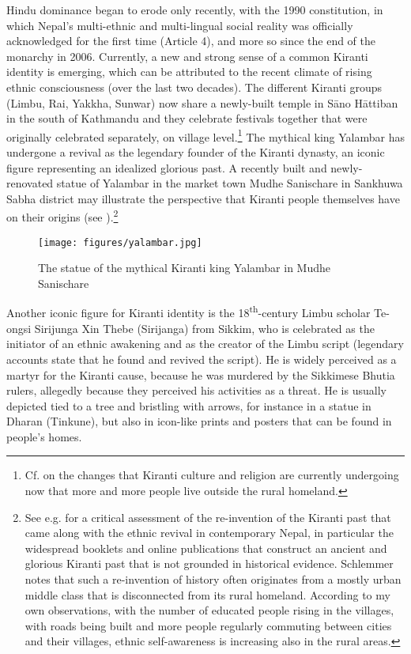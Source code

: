 Hindu dominance began to erode only recently, with the 1990 constitution, in which Nepal's multi-ethnic and multi-lingual social reality was officially acknowledged for the first time (Article 4), and more so since the end of the monarchy in 2006. Currently, a new and strong sense of a common Kiranti identity is emerging, which can be attributed to the recent climate of rising ethnic consciousness (over the last two decades). The different Kiranti groups (Limbu, Rai, Yakkha, Sunwar) now share a newly-built temple in Sāno Hāttiban in the south of Kathmandu and they celebrate festivals together that were originally celebrated separately, on
village level.\footnote{Cf. \citet{Gaenszle_Redefining} on the changes that Kiranti culture and religion are currently undergoing now that more and more people live outside the rural homeland.}  The mythical king Yalambar has undergone a revival as the legendary founder of the Kiranti dynasty, an iconic figure representing an idealized glorious past. A recently built and newly-renovated statue of Yalambar in the market town Mudhe Sanischare in Sankhuwa Sabha district may illustrate the perspective that Kiranti people themselves have on their origins (see ).\footnote{See e.g. \citet{Schlemmer2003_New} for a critical assessment of the re-invention of the Kiranti past that came along with the ethnic revival in contemporary Nepal, in particular the widespread booklets and online publications that construct an ancient and glorious Kiranti past that is not grounded in historical evidence. Schlemmer notes that such a re-invention of history often originates from a mostly urban middle class that is disconnected from its rural homeland. According to my own observations, with the number of educated people rising in the villages, with roads being built and more people regularly commuting between cities and their villages, ethnic self-awareness is increasing also in the rural areas.}

\begin{figure}
\centering
\texttt{[image: figures/yalambar.jpg]}
\caption{The statue of the mythical Kiranti king Yalambar in Mudhe Sanischare}\label{yalambar}
\end{figure}


Another iconic figure for Kiranti identity is the 18\textsuperscript{th}-century Limbu scholar Te-ongsi Sirijunga Xin Thebe (Sirijanga) from Sikkim, who is celebrated as the initiator of an ethnic awakening and as the creator of the Limbu script (legendary accounts state that he found and revived the script). He is widely perceived as a martyr for the Kiranti cause, because he was  murdered by the Sikkimese Bhutia rulers, allegedly because they perceived his activities as a threat. He is usually depicted tied to a tree and bristling with arrows, for instance in a statue in Dharan (Tinkune), but also in icon-like prints and posters that can be found in people's homes.


